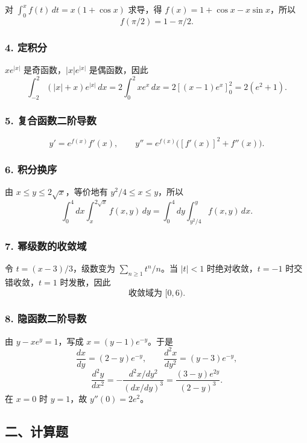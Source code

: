 \documentclass[11pt,fontset=fandol]{ctexart}
\begin{document}
对 \(\int_0^xf(t)\,dt=x(1+\cos x)\) 求导，得
\(f(x)=1+\cos x-x\sin x\)，所以 \[
\boxed{f(\pi/2)=1-\pi/2.}
\]

\subsubsection{4. 定积分}\label{ux5b9aux79efux5206}

\(xe^{|x|}\) 是奇函数，\(|x|e^{|x|}\) 是偶函数，因此 \[
\boxed{\int_{-2}^2(|x|+x)e^{|x|}\,dx
=2\int_0^2xe^x\,dx=2[(x-1)e^x]_0^2=2(e^2+1).}
\]

\subsubsection{5.
复合函数二阶导数}\label{ux590dux5408ux51fdux6570ux4e8cux9636ux5bfcux6570}

\[
y'=e^{f(x)}f'(x),\qquad
\boxed{y''=e^{f(x)}\bigl([f'(x)]^2+f''(x)\bigr).}
\]

\subsubsection{6. 积分换序}\label{ux79efux5206ux6362ux5e8f}

由 \(x\leq y\leq2\sqrt x\)，等价地有 \(y^2/4\leq x\leq y\)，所以 \[
\boxed{\int_0^4dx\int_x^{2\sqrt x}f(x,y)\,dy
=\int_0^4dy\int_{y^2/4}^yf(x,y)\,dx.}
\]

\subsubsection{7.
幂级数的收敛域}\label{ux5e42ux7ea7ux6570ux7684ux6536ux655bux57df}

令 \(t=(x-3)/3\)，级数变为 \(\sum_{n\geq1}t^n/n\)。当 \(|t|<1\)
时绝对收敛，\(t=-1\) 时交错收敛，\(t=1\) 时发散，因此 \[
\boxed{\text{收敛域为 }[0,6).}
\]

\subsubsection{8.
隐函数二阶导数}\label{ux9690ux51fdux6570ux4e8cux9636ux5bfcux6570}

由 \(y-xe^y=1\)，写成 \(x=(y-1)e^{-y}\)。于是 \[
\frac{dx}{dy}=(2-y)e^{-y},\qquad
\frac{d^2x}{dy^2}=(y-3)e^{-y},
\] \[
\frac{d^2y}{dx^2}
=-\frac{d^2x/dy^2}{(dx/dy)^3}
=\frac{(3-y)e^{2y}}{(2-y)^3}.
\] 在 \(x=0\) 时 \(y=1\)，故 \(\boxed{y''(0)=2e^2}\)。

\subsection{二、计算题}\label{ux4e8cux8ba1ux7b97ux9898}
\end{document}
